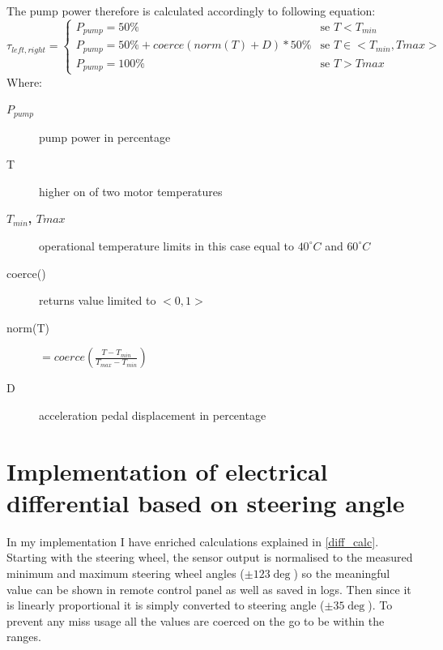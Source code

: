 The pump power therefore is calculated accordingly to following equation:
\begin{equation}\label{pump_eq}
    \tau_{left,right} = \begin{cases}
        P_{pump} = 50\% & \text{se $T<T_{min}$}\\
        P_{pump} = 50\%+coerce(norm(T) + D)*50\% & \text{se $T \in <T_{min},T{max}>$}\\
        P_{pump} = 100\% & \text{se $T>T{max}$}
    \end{cases}
\end{equation}
Where:
\begin{description}
    \item[$P_{pump}$] pump power in percentage
    \item[T] higher on of two motor temperatures
    \item[\textbf{$T_{min}$, $T{max}$}] operational temperature limits in this case equal to $40^\circ C$ and $60^\circ C$
    \item[coerce()] returns value limited to $<0,1>$
    \item[norm(T)] $=coerce(\frac{T - T_{min}}{T_{max}-T_{min}})$ 
    \item[D] acceleration pedal displacement in percentage
\end{description}

\section{Implementation of electrical differential based on steering angle}\label{diff_meth}
In my implementation I have enriched calculations explained in \ref{diff_calc}. Starting with the steering wheel, the sensor output is normalised to the measured minimum and maximum steering wheel angles ($\pm123\deg$) so the meaningful value can be shown in remote control panel as well as saved in logs. 
Then since it is linearly proportional it is simply converted to steering angle ($\pm35\deg$). To prevent any miss usage all the values are coerced on the go to be within the ranges.

